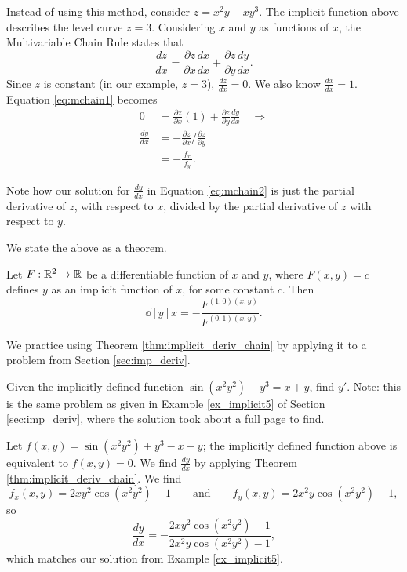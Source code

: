 \documentclass{ximera}
\begin{document}
Instead of using this method, consider $z=x^2y-xy^3$. The implicit
function above describes the level curve $z=3$. Considering $x$ and
$y$ as functions of $x$, the Multivariable Chain Rule states that
\[
\frac{dz}{dx} = \frac{\partial z}{\partial x}\frac{dx}{dx}+\frac{\partial z}{\partial y}\frac{dy}{dx}.\label{eq:mchain1}
\]
Since $z$ is constant (in our example, $z=3$), $\frac{dz}{dx} = 0$. We
also know $\frac{dx}{dx} = 1$. Equation \eqref{eq:mchain1} becomes
\begin{align*}
  0 &= \frac{\partial z}{\partial x}(1) + \frac{\partial z}{\partial
    y}\frac{dy}{dx} \quad \Rightarrow\\[5pt] \frac{dy}{dx} &=
  -\frac{\partial z}{\partial x}\Big/\frac{\partial z}{\partial
    y}\\[5pt] &= -\frac{\,f_x\,}{f_y}.
\end{align*}

Note how our solution for $\frac{dy}{dx}$ in Equation \eqref{eq:mchain2} is just the partial derivative of $z$, with respect to $x$, divided by the partial derivative of $z$ with respect to $y$.

We state the above as a theorem.

\begin{theorem}
  Let $F:\mathbb R^2\to\mathbb R$ be a differentiable function of $x$ and $y$, where
  $F(x,y)=c$ defines $y$ as an implicit function of $x$, for some
  constant $c$. Then 
  \[
  \dd[y]{x} = -\frac{F^{(1,0)(x,y)}}{F^{(0,1)(x,y)}}.
  \]
\end{theorem}


We practice using Theorem \ref{thm:implicit_deriv_chain} by applying it to a problem from Section \ref{sec:imp_deriv}.\\

\begin{example}
  Given the implicitly defined function $\sin(x^2y^2)+y^3=x+y$, find
  $y'$. Note: this is the same problem as given in Example
  \ref{ex_implicit5} of Section \ref{sec:imp_deriv}, where the
  solution took about a full page to find.
  \begin{explanation}
    Let $f(x,y) = \sin(x^2y^2)+y^3-x-y$; the implicitly defined
    function above is equivalent to $f(x,y)=0$. We find
    $\frac{dy}{dx}$ by applying Theorem
    \ref{thm:implicit_deriv_chain}. We find
    $$f_x(x,y) = 2xy^2\cos(x^2y^2)-1\qquad \text{and}\qquad f_y(x,y) = 2x^2y\cos(x^2y^2)-1,$$
    so 
    $$\frac{dy}{dx} = -\frac{2xy^2\cos(x^2y^2)-1}{2x^2y\cos(x^2y^2)-1},$$
    which matches our solution from Example \ref{ex_implicit5}.
  \end{explanation}
\end{example}

\end{document}
